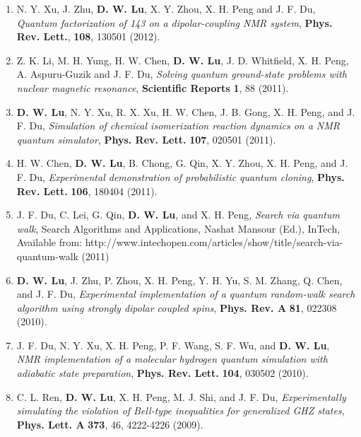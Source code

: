 \documentclass[a4paper,10pt]{article}
\begin{document}
\begin{enumerate}
\item N. Y. Xu, J. Zhu, \textbf{D. W. Lu}, X. Y. Zhou, X. H. Peng and J. F. Du, {\it Quantum factorization of 143 on a dipolar-coupling NMR system}, {\bf Phys. Rev. Lett.}, \textbf{108}, 130501 (2012).



\item Z. K. Li, M. H. Yung, H. W. Chen, \textbf{D. W. Lu}, J. D. Whitfield, X. H. Peng, A. Aspuru-Guzik and J. F. Du, {\it Solving quantum ground-state problems with nuclear magnetic resonance},
{\bf Scientific Reports} \textbf{1}, 88 (2011).

\item \textbf{D. W. Lu}, N. Y. Xu, R. X. Xu, H. W. Chen, J. B. Gong, X. H. Peng, and J. F. Du,
 {\it Simulation of chemical isomerization reaction dynamics on a NMR quantum simulator},
{\bf Phys. Rev. Lett.} \textbf{107}, 020501 (2011).

\item H. W. Chen, \textbf{D. W. Lu}, B. Chong, G. Qin, X. Y. Zhou, X. H. Peng, and J. F. Du,
 {\it Experimental demonstration of probabilistic quantum cloning},
{\bf Phys. Rev. Lett.} \textbf{106}, 180404 (2011).

\item J. F. Du, C. Lei, G. Qin, \textbf{D. W. Lu}, and X. H. Peng, {\it Search via quantum walk}, Search Algorithms and Applications, Nashat Mansour (Ed.), InTech,  Available from: http://www.intechopen.com/articles/show/title/search-via-quantum-walk (2011)

\item \textbf{D. W. Lu}, J. Zhu, P. Zhou, X. H. Peng, Y. H. Yu, S. M. Zhang, Q. Chen, and J. F. Du, {\it Experimental implementation of a quantum random-walk search algorithm using strongly dipolar coupled spins}, {\bf Phys. Rev. A} \textbf{81}, 022308 (2010).

\item J. F. Du, N. Y. Xu, X. H. Peng, P. F. Wang, S. F. Wu, and \textbf{D. W. Lu},
 {\it NMR implementation of a molecular hydrogen quantum simulation with adiabatic state preparation},
{\bf Phys. Rev. Lett.} \textbf{104}, 030502 (2010).

\item C. L. Ren, \textbf{D. W. Lu}, X. H. Peng, M. J. Shi, and J. F. Du, {\it Experimentally simulating the violation of Bell-type inequalities for generalized GHZ states}, {\bf Phys. Lett. A} \textbf{373}, 46, 4222-4226 (2009).


\end{enumerate}
\medskip
\end{document}
